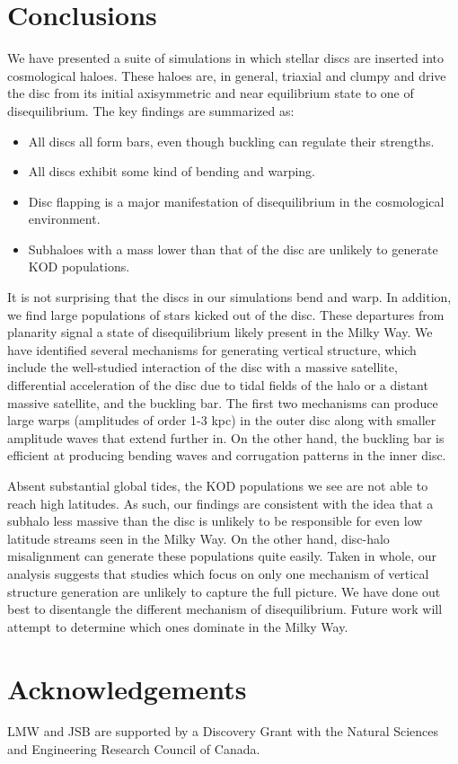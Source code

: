 \section{Conclusions}\label{sec:conclusion}
{We have presented a suite of simulations in which stellar discs are
inserted into cosmological haloes. These haloes are, in general,
triaxial and clumpy and drive the disc from its initial axisymmetric
and near equilibrium state to one of disequilibrium. The key findings are summarized as:
\begin{itemize}
\item All discs all form bars, even though buckling can regulate their strengths.
\item All discs exhibit some kind of bending and warping.
\item Disc flapping is a major manifestation of disequilibrium in the cosmological environment.
\item Subhaloes with a mass lower than that of the disc are unlikely to generate KOD populations.
\end{itemize}}
{It is not surprising that} the discs in our simulations bend and warp. In
addition, we find large populations of stars kicked out of the disc.
These departures from planarity signal a state of disequilibrium {likely present in the Milky Way}.  We
have identified several mechanisms for generating vertical structure, which
include the well-studied interaction of the disc with a massive
satellite, differential acceleration of the disc due to tidal fields
of the halo or a distant massive satellite, and the buckling bar.
The first two mechanisms can produce large warps (amplitudes of
order 1-3 kpc) in the outer disc along with smaller amplitude 
waves that extend further in. On the other hand, the buckling bar
is efficient at producing bending waves and corrugation patterns 
in the inner disc.

{Absent substantial global tides, the KOD populations we see are not able to reach high latitudes. As such, o}ur findings are consistent with the idea that a subhalo less
massive than the disc is unlikely to be responsible for even low
latitude streams seen in the Milky Way. On the other hand, disc-halo
misalignment can generate these populations quite easily. {Taken in whole, our analysis suggests that studies which focus on only one mechanism of vertical structure generation are unlikely to capture the full picture. We have done out best to disentangle the different mechanism of disequilibrium. Future work will attempt to determine which ones dominate in the Milky Way.}

\section*{Acknowledgements}
{LMW and JSB are supported by a Discovery Grant with the Natural
  Sciences and Engineering Research Council of Canada.}
  
  





